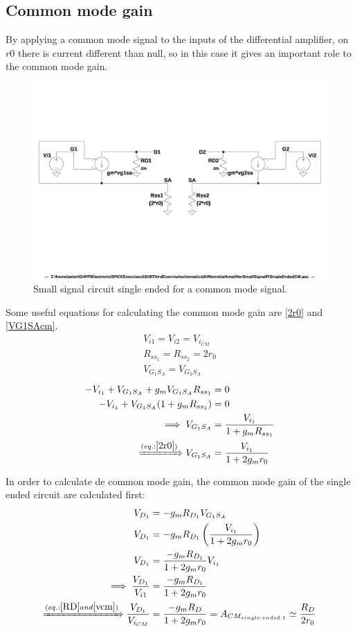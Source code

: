 \subsection{Common mode gain}
By applying a common mode signal to the inputs of the differential amplifier, on $r0$ there is current different than null, so in this case it gives an important role to the common mode gain.\\
\begin{figure}[h]
  \centering
  \includegraphics[width=12cm]{schematics/DifferentialAmplifier/SmallSignalPiSingleEndedCM.jpg}
  \caption{Small signal circuit single ended for a common mode signal.}
  \label{PiSingle2}
\end{figure}
Some useful equations for calculating the common mode gain are \ref{2r0} and \ref{VG1SAcm}.\\
\begin{align}
V_{i1} = V_{i2} = V_{i_{CM}} \label{vcm}\\
R_{ss_1} = R_{ss_2} = 2 r_0 \label{2r0}\\
V_{G_1S_A} = V_{G_2S_A}
\end{align}
\begin{align}
-V_{i_1} + V_{G_1S_A} + g_m V_{G_1S_A} R_{ss_1} &= 0\\
-V_{i_1} + V_{G_1S_A} (1+g_m R_{ss_1}) &= 0\\
\implies V_{G_1S_A} &= \frac{V_{i_1}}{1+g_m R_{ss_1}}\\ \xRightarrow{(eq.: \ref{2r0})}
V_{G_1S_A} &= \frac{V_{i_1}}{1+2g_m r_0}\label{VG1SAcm}
\end{align}

In order to calculate de common mode gain, the common mode gain of the single ended circuit are calculated first:\\
\begin{align}
V_{D_1} &= -g_m R_{D_1}V_{G_1S_A}\\
V_{D_1} &= -g_m R_{D_1} \left(\frac{V_{i_1}}{1+2g_m r_0} \right)\\
V_{D_1} &= \frac{-g_m R_{D_1}}{1+2g_m r_0}V_{i_1}\\
\implies \frac{V_{D_1}}{V_{i1}} &= \frac{-g_m R_{D_1}}{1+2g_m r_0}\\
\xRightarrow{(eq.: \ref{RD} and \ref{vcm})} \frac{V_{D_1}}{V_{i_{CM}}} &= \frac{-g_m R_{D}}{1+2g_m r_0} = A_{CM_{single\cdot ended\cdot 1}} \simeq \frac{R_{D}}{2r_0}
\end{align}

